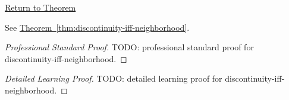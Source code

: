 \newpage
{}
\label{prf:discontinuity-iff-neighborhood}

\begin{remark*}[Return]
\hyperref[thm:discontinuity-iff-neighborhood]{Return to Theorem}
\end{remark*}

\begin{theorem*}
See \hyperref[thm:discontinuity-iff-neighborhood]{Theorem~\ref*{thm:discontinuity-iff-neighborhood}}.
\end{theorem*}

\begin{proof}[Professional Standard Proof]
\LRAProofBodyStart
TODO: professional standard proof for discontinuity-iff-neighborhood.
\end{proof}

\begin{proof}[Detailed Learning Proof]
\LRAProofBodyStart
TODO: detailed learning proof for discontinuity-iff-neighborhood.
\end{proof}

\begin{remark*}
\end{remark*}

\begin{dependencies}
\NoLocalDependencies
\end{dependencies}

\clearpage
